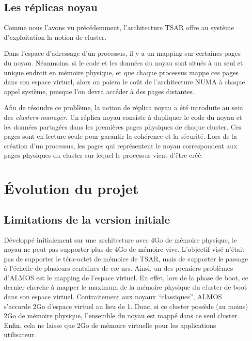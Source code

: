      
    \subsection{Les réplicas noyau}

      Comme nous l'avons vu précédemment, l'architecture TSAR offre au système
      d'exploitation la notion de cluster.
      
      Dans l'espace d'adressage d'un processus, il y a un mapping sur certaines
      pages du noyau. Néanmoins, si le code et les données du noyau sont situés
      à un seul et unique endroit en mémoire physique, et que chaque processus
      mappe ces pages dans son espace virtuel, alors on paiera le coût de
      l'architecture NUMA à chaque appel système, puisque l'on devra accéder à
      des pages distantes.

      Afin de résoudre ce problème, la notion de réplica noyau a été introduite
      au sein des \textit{clusters-manager}. Un réplica noyau consiste à
      dupliquer le code du noyau et les données partagées dans les premières
      pages physiques de chaque cluster. Ces pages sont en lecture seule pour
      garantir la cohérence et la sécurité. Lors de la création d'un processus,
      les pages qui représentent le noyau correspondent aux pages physiques du
      cluster sur lequel le processus vient d'être créé.


  \section{Évolution du projet}

    \subsection{Limitations de la version initiale}
    
      Développé initialement sur une architecture avec 4Go de mémoire physique,
      le noyau ne peut pas supporter plus de 4Go de mémoire vive. L'objectif
      visé n'était pas de supporter le téra-octet de mémoire de TSAR, mais de
      supporter le passage à l'échelle de plusieurs centaines de c\oe
      urs. Ainsi, un des premiers problèmes d'ALMOS est le mapping de l'espace
      virtuel. En effet, lors de la phase de boot, ce dernier cherche à mapper
      le maximum de la mémoire physique du cluster de boot dans son espace
      virtuel. Contraitement aux noyaux ``classiques'', ALMOS s'accorde 2Go
      d'espace virtuel au lieu de 1. Donc, si ce cluster possède (au moins) 2Go
      de mémoire physique, l'ensemble du noyau est mappé dans ce seul
      cluster. Enfin, cela ne laisse que 2Go de mémoire virtuelle pour les
      applications utilisateur.

